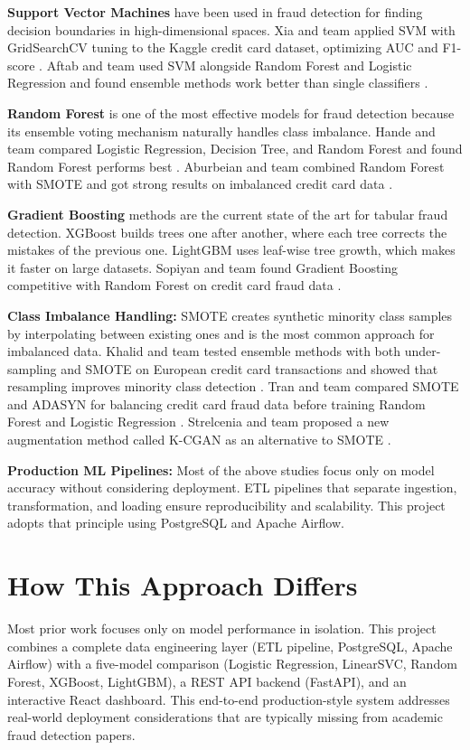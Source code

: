 \documentclass[11pt]{article}
\begin{document}
\textbf{Support Vector Machines} have been used in fraud detection for finding decision boundaries in high-dimensional spaces. Xia and team applied SVM with GridSearchCV tuning to the Kaggle credit card dataset, optimizing AUC and F1-score \cite{xia2022credit}. Aftab and team used SVM alongside Random Forest and Logistic Regression and found ensemble methods work better than single classifiers \cite{aftab2023fraud}.

\textbf{Random Forest} is one of the most effective models for fraud detection because its ensemble voting mechanism naturally handles class imbalance. Hande and team compared Logistic Regression, Decision Tree, and Random Forest and found Random Forest performs best \cite{hande2019credit}. Aburbeian and team combined Random Forest with SMOTE and got strong results on imbalanced credit card data \cite{aburbeian2023credit}.

\textbf{Gradient Boosting} methods are the current state of the art for tabular fraud detection. XGBoost builds trees one after another, where each tree corrects the mistakes of the previous one. LightGBM uses leaf-wise tree growth, which makes it faster on large datasets. Sopiyan and team found Gradient Boosting competitive with Random Forest on credit card fraud data \cite{sopiyan2022fraud}.

\textbf{Class Imbalance Handling:} SMOTE creates synthetic minority class samples by interpolating between existing ones and is the most common approach for imbalanced data. Khalid and team tested ensemble methods with both under-sampling and SMOTE on European credit card transactions and showed that resampling improves minority class detection \cite{khalid2024enhancing}. Tran and team compared SMOTE and ADASYN for balancing credit card fraud data before training Random Forest and Logistic Regression \cite{tran2021machine}. Strelcenia and team proposed a new augmentation method called K-CGAN as an alternative to SMOTE \cite{strelcenia2023improving}.

\textbf{Production ML Pipelines:} Most of the above studies focus only on model accuracy without considering deployment. ETL pipelines that separate ingestion, transformation, and loading ensure reproducibility and scalability. This project adopts that principle using PostgreSQL and Apache Airflow.

\section{How This Approach Differs}

Most prior work focuses only on model performance in isolation. This project combines a complete data engineering layer (ETL pipeline, PostgreSQL, Apache Airflow) with a five-model comparison (Logistic Regression, LinearSVC, Random Forest, XGBoost, LightGBM), a REST API backend (FastAPI), and an interactive React dashboard. This end-to-end production-style system addresses real-world deployment considerations that are typically missing from academic fraud detection papers.



\end{document}
